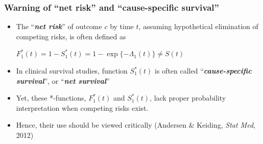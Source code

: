 \documentclass[handout,12pt,dvipsnames,t]{beamer}
\begin{document}
\begin{frame}[fragile]
\frametitle{Warning of ``net risk'' and ``cause-specific survival''}

\begin{itemize}                              
\item
The ``\textbf{\textit{net risk}}'' of outcome $c$ by time $t$, 
assuming hypothetical elimination of competing risks,
is often defined as
\begin{center}
$ F_1^*(t) = 1 - S_1^*(t) = 1- \exp\{ - \Lambda_1(t) \} \ne S(t) $
\end{center}
\medskip
\item
In clinical survival studies, function 
$S_1^*(t)$ is often called ``\textbf{\textit{cause-specific survival}}'',
or ``\textbf{\textit{net survival}}''
\medskip
\item
Yet, these *-functions, $ F_1^*(t)$ and $S_1^*(t)$, lack proper probability interpretation when
 competing risks exist.
\medskip
\item
Hence, their use 
should be viewed critically
(Andersen \& Keiding, \textit{Stat Med}, 2012)
\end{itemize}
\end{frame}


% 
\end{document}
